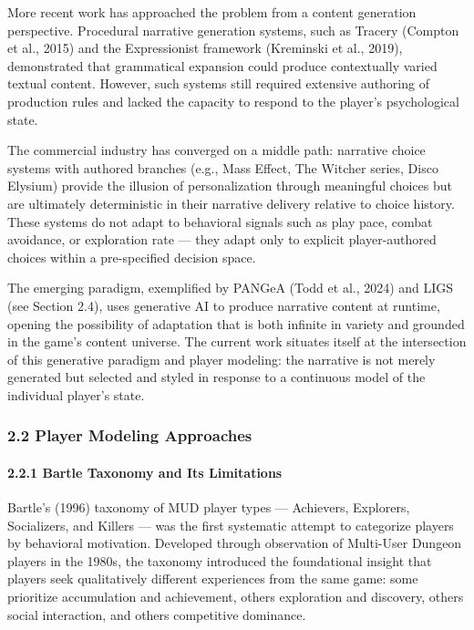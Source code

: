 More recent work has approached the problem from a content generation
perspective. Procedural narrative generation systems, such as Tracery
(Compton et al., 2015) and the Expressionist framework (Kreminski et
al., 2019), demonstrated that grammatical expansion could produce
contextually varied textual content. However, such systems still
required extensive authoring of production rules and lacked the capacity
to respond to the player's psychological state.

The commercial industry has converged on a middle path: narrative choice
systems with authored branches (e.g., Mass Effect, The Witcher series,
Disco Elysium) provide the illusion of personalization through
meaningful choices but are ultimately deterministic in their narrative
delivery relative to choice history. These systems do not adapt to
behavioral signals such as play pace, combat avoidance, or exploration
rate --- they adapt only to explicit player-authored choices within a
pre-specified decision space.

The emerging paradigm, exemplified by PANGeA (Todd et al., 2024) and
LIGS (see Section 2.4), uses generative AI to produce narrative content
at runtime, opening the possibility of adaptation that is both infinite
in variety and grounded in the game's content universe. The current work
situates itself at the intersection of this generative paradigm and
player modeling: the narrative is not merely generated but selected and
styled in response to a continuous model of the individual player's
state.

\subsubsection{2.2 Player Modeling
Approaches}\label{player-modeling-approaches}

\paragraph{2.2.1 Bartle Taxonomy and Its
Limitations}\label{bartle-taxonomy-and-its-limitations}

Bartle's (1996) taxonomy of MUD player types --- Achievers, Explorers,
Socializers, and Killers --- was the first systematic attempt to
categorize players by behavioral motivation. Developed through
observation of Multi-User Dungeon players in the 1980s, the taxonomy
introduced the foundational insight that players seek qualitatively
different experiences from the same game: some prioritize accumulation
and achievement, others exploration and discovery, others social
interaction, and others competitive dominance.

